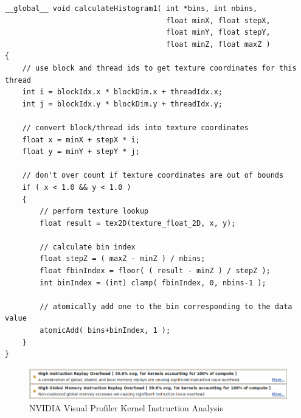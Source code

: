 \documentclass{article}
\begin{document}
\lstset{language=C,basicstyle=\footnotesize}
\begin{minipage}{\textwidth}
\begin{lstlisting}[caption={Global Memory atomicAdd kernel},label={kernel1}]
__global__ void calculateHistogram1( int *bins, int nbins,
                                     float minX, float stepX,
                                     float minY, float stepY,
                                     float minZ, float maxZ )
{
    // use block and thread ids to get texture coordinates for this thread
    int i = blockIdx.x * blockDim.x + threadIdx.x;
    int j = blockIdx.y * blockDim.y + threadIdx.y;

    // convert block/thread ids into texture coordinates
    float x = minX + stepX * i;
    float y = minY + stepY * j;

    // don't over count if texture coordinates are out of bounds
    if ( x < 1.0 && y < 1.0 )
    {
        // perform texture lookup
        float result = tex2D(texture_float_2D, x, y);
    
        // calculate bin index
        float stepZ = ( maxZ - minZ ) / nbins;
        float fbinIndex = floor( ( result - minZ ) / stepZ );
        int binIndex = (int) clamp( fbinIndex, 0, nbins-1 );
    
        // atomically add one to the bin corresponding to the data value
        atomicAdd( bins+binIndex, 1 );
    }
}
\end{lstlisting}
\end{minipage}

\begin{figure}
\centering
\includegraphics[width=1.0\textwidth]{screenshots/nvvp/calculateHistogram1_screen2.png}
\caption{NVIDIA Visual Profiler Kernel Instruction Analysis}
\label{kernel1nvvp2}
\end{figure}



\end{document}
